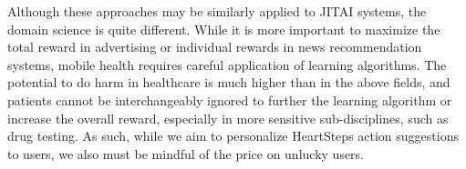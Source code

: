 Although these approaches may be similarly applied to JITAI systems, the domain science is quite different.  While it is more important to maximize the total reward in advertising or individual rewards in news recommendation systems, mobile health requires careful application of learning algorithms.  The potential to do harm in healthcare is much higher than in the above fields, and patients cannot be interchangeably ignored to further the learning algorithm or increase the overall reward, especially in more sensitive sub-disciplines, such as drug testing.  As such, while we aim to personalize HeartSteps action suggestions to users, we also must be mindful of the price on unlucky users.





